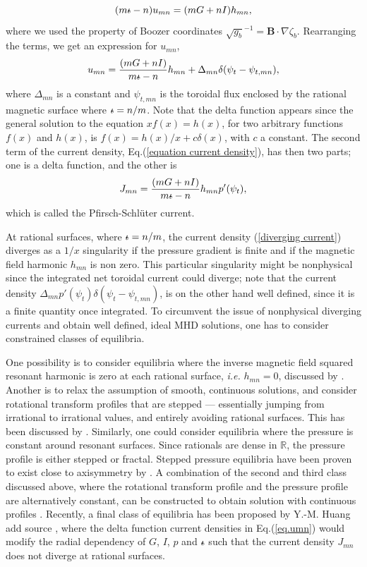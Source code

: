 \documentclass[my_thesis.tex]{subfiles}
\begin{document}
\begin{equation}
	(m\text{$\iota\!\!$-} - n)u_{mn} = (mG + nI)h_{mn},
\end{equation}
where we used the property of Boozer coordinates $\sqrt{g_b}^{-1}=\mathbf{B}\cdot\nabla\zeta_b$. Rearranging the terms, we get an expression for $u_{mn}$,
\begin{equation}
	u_{mn} = \frac{(mG + nI)}{m\text{$\iota\!\!$-} - n}h_{mn} + \Delta_{mn}\delta(\psi_t-\psi_{t,mn}),\label{eq.umn}
\end{equation}
where $\Delta_{mn}$ is a constant and $\psi_{t,mn}$ is the toroidal flux enclosed by the rational magnetic surface where $\text{$\iota\!\!$-}=n/m$. Note that the delta function appears since the general solution to the equation $xf(x)=h(x)$, for two arbitrary functions $f(x)$ and $h(x)$, is $f(x) = h(x)/x + c\delta(x)$, with $c$ a constant. The second term of the current density, Eq.(\ref{equation current density}), has then two parts; one is a delta function, and the other is
\begin{equation}
	J_{mn} = \frac{(mG + nI)}{m\text{$\iota\!\!$-} - n}h_{mn}p'(\psi_t),\label{diverging current}
\end{equation}
which is called the Pfirsch-Schl\"uter current.

At rational surfaces, where $\text{$\iota\!\!$-}=n/m$, the current density (\ref{diverging current}) diverges as a $1/x$ singularity if the pressure gradient is finite and if the magnetic field harmonic $h_{mn}$ is non zero. This particular singularity might be nonphysical since the integrated net toroidal current could diverge; note that the current density $\Delta_{mn} p'(\psi_t) \delta(\psi_t-\psi_{t,mn})$, is on the other hand well defined, since it is a finite quantity once integrated. To circumvent the issue of nonphysical diverging currents and obtain well defined, ideal MHD solutions, one has to consider constrained classes of equilibria.

One possibility is to consider equilibria where the inverse magnetic field squared resonant harmonic is zero at each rational surface, \emph{i.e.} $h_{mn}=0$, discussed by \citet{Weitzner2014}. Another is to relax the assumption of smooth, continuous solutions, and consider rotational transform profiles that are stepped --- essentially jumping from irrational to irrational values, and entirely avoiding rational surfaces. This has been discussed by \citet{Loizu2015a}. Similarly, one could consider equilibria where the pressure is constant around resonant surfaces. Since rationals are dense in $\mathbb{R}$, the pressure profile is either stepped or fractal. Stepped pressure equilibria have been proven to exist close to axisymmetry by \citet{Bruno1996}. A combination of the second and third class discussed above, where the rotational transform profile and the pressure profile are alternatively constant, can be constructed to obtain solution with continuous profiles \citep{Hudson2017a}. Recently, a final class of equilibria has been proposed by Y.-M. Huang {\color{red} add source} \cite{yiminpaper}, where the delta function current densities in Eq.(\ref{eq.umn}) would modify the radial dependency of $G$, $I$, $p$ and $\text{$\iota\!\!$-}$ such that the current density $J_{mn}$ does not diverge at rational surfaces.
\end{document}
